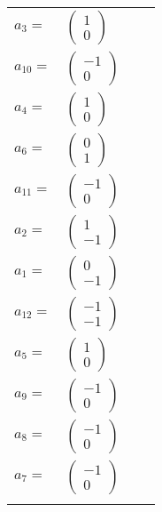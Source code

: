 \documentclass[1p]{elsarticle_modified}
\theoremstyle{definition}
\begin{document}
\begin{tabular}{m{7pt} m{180pt} m{7pt} m{180pt} }
\flushright $a_{3}=$&$\begin{pmatrix}1\\0\end{pmatrix}$ \\
\flushright $a_{10}=$&$\begin{pmatrix}-1\\0\end{pmatrix}$ \\
\flushright $a_{4}=$&$\begin{pmatrix}1\\0\end{pmatrix}$ \\
\flushright $a_{6}=$&$\begin{pmatrix}0\\1\end{pmatrix}$ \\
\flushright $a_{11}=$&$\begin{pmatrix}-1\\0\end{pmatrix}$ \\
\flushright $a_{2}=$&$\begin{pmatrix}1\\-1\end{pmatrix}$ \\
\flushright $a_{1}=$&$\begin{pmatrix}0\\-1\end{pmatrix}$ \\
\flushright $a_{12}=$&$\begin{pmatrix}-1\\-1\end{pmatrix}$ \\
\flushright $a_{5}=$&$\begin{pmatrix}1\\0\end{pmatrix}$ \\
\flushright $a_{9}=$&$\begin{pmatrix}-1\\0\end{pmatrix}$ \\
\flushright $a_{8}=$&$\begin{pmatrix}-1\\0\end{pmatrix}$ \\
\flushright $a_{7}=$&$\begin{pmatrix}-1\\0\end{pmatrix}$\\&\end{tabular}
\end{document}
